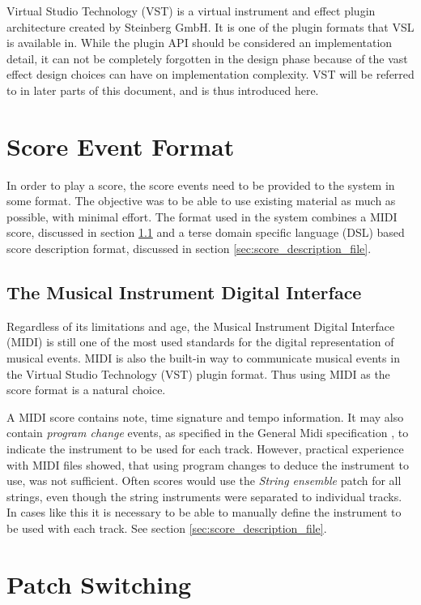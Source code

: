 Virtual Studio Technology (VST) \cite{vst} is
a virtual instrument and effect plugin architecture created by Steinberg GmbH.
It is one of the plugin formats that VSL is available in.
While the plugin API should be considered an implementation detail,
it can not be completely forgotten in the design phase
because of the vast effect design choices can have on implementation complexity.
VST will be referred to in later parts of this document,
and is thus introduced here.

\section{Score Event Format}

In order to play a score,
the score events need to be provided to the system in some format.
The objective was to be able to use existing material as much as possible,
with minimal effort.
The format used in the system combines
a MIDI score, discussed in section \ref{sec:midi} and
a terse domain specific language (DSL) based score description format,
discussed in section \ref{sec:score_description_file}.

\subsection{The Musical Instrument Digital Interface}
\label{sec:midi}

Regardless of its limitations and age,
the Musical Instrument Digital Interface (MIDI)
is still one of the most used standards
for the digital representation of musical events.
MIDI is also the built-in way to communicate musical events
in the Virtual Studio Technology (VST) plugin format.
Thus using MIDI as the score format is a natural choice.

A MIDI score contains note, time signature and tempo information.
It may also contain \textit{program change} events,
as specified in the General Midi specification \cite{GeneralMidi},
to indicate the instrument to be used for each track.
However, practical experience with MIDI files showed,
that using program changes to deduce the instrument to use,
was not sufficient.
Often scores would use the
\textit{String ensemble} patch for all strings,
even though the string instruments were separated to individual tracks.
In cases like this it is necessary to be able to manually
define the instrument to be used with each track.
See section \ref{sec:score_description_file}.

\section{Patch Switching}
\label{sec:patch_switching}

